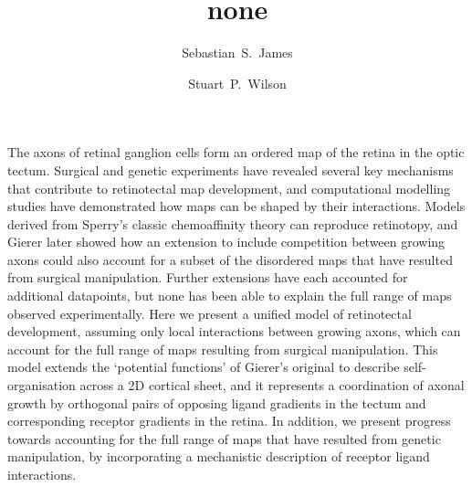 \documentclass[9pt]{elife} %
\title {none}
\author[1]{Sebastian~S.~James}
\author[1*]{Stuart~P.~Wilson}
\affil[1]{Department of Psychology, The University of Sheffield, Sheffield, United Kingdom.}
\begin{document}
The axons of retinal ganglion cells form an ordered map of the retina
in the optic tectum. Surgical and genetic experiments have revealed
several key mechanisms that contribute to retinotectal map
development, and computational modelling studies have demonstrated how
maps can be shaped by their interactions. Models derived from Sperry's
classic chemoaffinity theory can reproduce retinotopy, and Gierer
later showed how an extension to include competition between growing
axons could also account for a subset of the disordered maps that have
resulted from surgical manipulation. Further extensions have each
accounted for additional datapoints, but none has been able to explain
the full range of maps observed experimentally. Here we present a
unified model of retinotectal development, assuming only local
interactions between growing axons, which can account for the full
range of maps resulting from surgical manipulation. This model extends
the `potential functions' of Gierer's original to describe
self-organisation across a 2D cortical sheet, and it represents a
coordination of axonal growth by orthogonal pairs of opposing ligand
gradients in the tectum and corresponding receptor gradients in the
retina. In addition, we present progress towards accounting for the
full range of maps that have resulted from genetic manipulation, by
incorporating a mechanistic description of receptor ligand
interactions.

%
\end{document}
